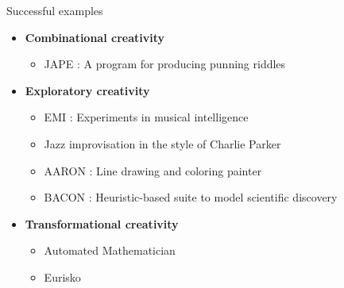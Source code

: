 \begin{frame}[t]{Successful examples}
  \begin{itemize}
  \item \textbf{Combinational creativity}
  \begin{itemize}
  \item JAPE : A program for producing punning riddles \cite{binsted1996machine} 
  \end{itemize}
  \item \textbf{Exploratory creativity}
  \begin{itemize}
  \item EMI : Experiments in musical intelligence \cite{cope1991computers}
  \item Jazz improvisation in the style of Charlie Parker \cite{hodgson2005modelling}
  \item AARON : Line drawing and coloring painter \cite{cohen1995further}
  \item BACON : Heuristic-based suite to model scientific discovery \cite{stacey1988scientific}
  \end{itemize}
  \item \textbf{Transformational creativity}
  \begin{itemize}
  \item Automated Mathematician \cite{lenat1983role}
  \item Eurisko \cite{lenat1983role}
  \end{itemize}
  \end{itemize}
  

\end{frame}
